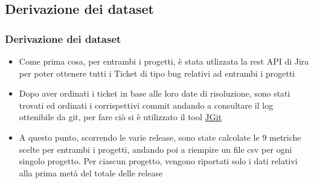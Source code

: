 \documentclass[10pt]{beamer}
\begin{document}
\begin{frame}
\section{Derivazione dei dataset}
\frametitle{Derivazione dei dataset}
\begin{itemize}
\item Come prima cosa, per entrambi i progetti, è stata utlizzata la rest API di Jira per poter ottenere tutti i Ticket di tipo bug relativi ad entrambi i progetti
\item Dopo aver ordinati i ticket in base alle loro date di risoluzione, sono stati trovati ed ordinati i corrispettivi commit andando a consultare il log ottenibile da git, per fare ciò si è utilizzato il tool \href{https://wiki.eclipse.org/JGit/User_Guide}{JGit}
\item A questo punto, scorrendo le varie release, sono state calcolate le 9 metriche scelte per entrambi i progetti, andando poi a riempire un file csv per ogni singolo progetto. Per ciascun progetto, vengono riportati solo i dati relativi alla prima metà del totale delle release
\end{itemize}
\end{frame}
\end{document}
